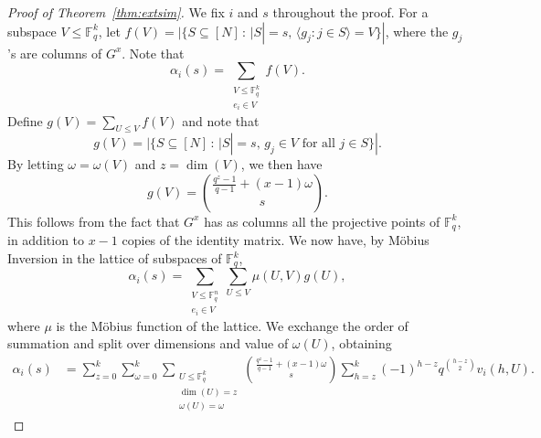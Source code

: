 \documentclass[11pt,a4paper,reqno,twoside]{amsart}
\theoremstyle{definition}
\newtheorem{lemma}{Lemma}
\newcommand{\F}{\mathbb{F}}
\newcommand\qbin[3]{\left[\begin{matrix} #1 \\ #2 \end{matrix}\right]_{#3}}
\begin{document}



\begin{proof}[Proof of Theorem~\ref{thm:extsim}]
We fix $i$ and $s$ throughout the proof.  For a subspace $V \le \F_q^k$, let
 $f(V)=|\{S \subseteq [N] \, : \, |S|=s, \, \langle g_j : j \in S \rangle =V\}|$, where the $g_j$'s are columns of $G^x$.
 Note that 
 \begin{equation} \label{aha}
     \alpha_i(s)=\sum_{\substack{V \le \F_q^k \\ e_i \in V}}f(V).
 \end{equation}
 Define $g(V)=\sum_{U \le V}f(V)$ and note that
 $$g(V) = |\{S \subseteq [N] \, : \, |S|=s, \, g_j \in V \mbox{ for all $j \in S$}\}|.$$
By letting $\omega=\omega(V)$ and $z=\dim(V)$, we then have
 \begin{equation}
     g(V)= \binom{\frac{q^z-1}{q-1}+(x-1)\omega}{s}.
 \end{equation}
 This follows from the fact that $G^x$ has as columns all the projective points of $\F_q^k$, in addition to $x-1$ copies of the identity matrix.
We now have, by Möbius Inversion in the lattice of subspaces of $\F_q^k$,
 $$\alpha_i(s)=\sum_{\substack{V \le \F_q^n \\ e_i \in V}} \sum_{U \le V} \mu(U,V) g(U),$$
 where $\mu$ is the Möbius function of the lattice.
 We exchange the order of summation and split over dimensions and value of $\omega(U)$, obtaining 
 \begin{align*}
     \alpha_i(s) &= \sum_{z=0}^k \sum_{\omega=0}^k \sum_{\substack{U \le \F_q^k \\ \dim(U)=z\\ \omega(U)=\omega}} \binom{\frac{q^z-1}{q-1}+(x-1)\omega}{s} \sum_{h=z}^k (-1)^{h-z} q^{\binom{h-z}{2}} v_i(h,U).
 \end{align*}

\end{proof}
\end{document}
